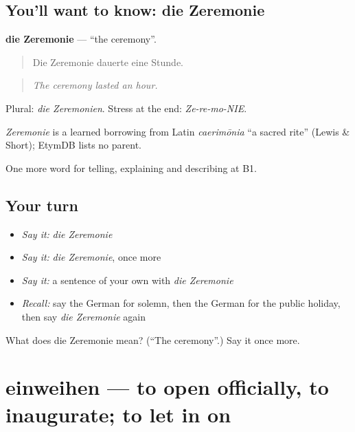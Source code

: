 \subsection*{You'll want to know: die Zeremonie}
\textbf{die Zeremonie} — \textquotedblleft{}the ceremony\textquotedblright{}.

\begin{quote}
Die Zeremonie dauerte eine Stunde.
\end{quote}

\begin{quote}
\emph{The ceremony lasted an hour.}
\end{quote}

Plural: \emph{die Zeremonien}. Stress at the end: \emph{Ze-re-mo-NIE}.

\begin{cousinweb}
\emph{Zeremonie} is a learned borrowing from Latin \emph{caerimōnia} \textquotedblleft{}a sacred rite\textquotedblright{} (Lewis \& Short); EtymDB lists no parent.
\end{cousinweb}

\begin{grammarlens}[title={What you've built}]
One more word for telling, explaining and describing at B1.
\end{grammarlens}

\subsection*{Your turn}
\begin{itemize}
\raggedright
  \item \emph{Say it:} \emph{die Zeremonie}
  \item \emph{Say it:} \emph{die Zeremonie}, once more
  \item \emph{Say it:} a sentence of your own with \emph{die Zeremonie}
  \item \emph{Recall:} say the German for solemn, then the German for the public holiday, then say \emph{die Zeremonie} again
\end{itemize}

\begin{tcolorbox}[breakable,colback=teal!4,colframe=teal!35!black,title={Before you move on}]
What does die Zeremonie mean? (\textquotedblleft{}The ceremony\textquotedblright{}.) Say it once more.
\end{tcolorbox}
\section[einweihen]{einweihen — to open officially, to inaugurate; to let in on}

